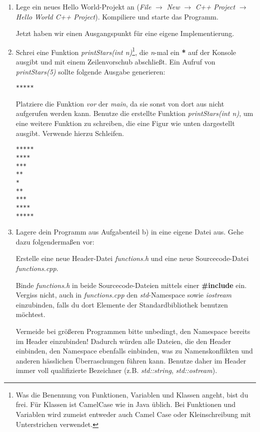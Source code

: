 \documentclass[
  accentcolor=tud1c,	%
  colorbacktitle,		%
  inverttitle,			%
  german,				%
  twoside
]{tudexercise}
\begin{document}
\begin{enumerate}

\item Lege ein neues \glqq{}Hello World\grqq{}-Projekt an (\emph{File} $\rightarrow$ \emph{New} $\rightarrow$ \emph{C++ Project} $\rightarrow$ \emph{Hello World C++ Project}).
Kompiliere und starte das Programm.

Jetzt haben wir einen Ausgangspunkt für eine eigene Implementierung.


\item 
Schrei eine Funktion \emph{printStars(int n)}\footnote{Was die Benennung von Funktionen, Variablen und Klassen angeht, bist du frei.
Für Klassen ist CamelCase wie in Java üblich. Bei Funktionen und Variablen wird zumeist entweder auch Camel Case oder Kleinschreibung mit Unterstrichen verwendet.}, die \emph{n}-mal ein \textbf{*} auf der Konsole ausgibt und mit einem Zeilenvorschub abschließt.
Ein Aufruf von \emph{printStars(5)} sollte folgende Ausgabe generieren:
\begin{lstlisting}
*****
\end{lstlisting}

Platziere die Funktion \emph{vor} der \emph{main}, da sie sonst von dort aus nicht aufgerufen werden kann.
Benutze die erstellte Funktion \emph{printStars(int n)}, um eine weitere Funktion zu schreiben, die eine Figur wie unten dargestellt ausgibt.
Verwende hierzu Schleifen.
\begin{lstlisting}
*****
****
***
**
*
**
***
****
*****
\end{lstlisting}

\item
Lagere dein Programm aus Aufgabenteil b) in eine eigene Datei aus.
Gehe dazu folgendermaßen vor: 

Erstelle eine neue Header-Datei \emph{functions.h} und eine neue Sourcecode-Datei \emph{functions.cpp}. 

Binde \emph{functions.h} in beide Sourcecode-Dateien mittels 
einer \textbf{\#include} ein.
Vergiss nicht, auch in \emph{functions.cpp} den \emph{std}-Namespace sowie \emph{iostream} einzubinden, falls du dort Elemente der Standardbibliothek benutzen möchtest.

Vermeide bei größeren Programmen bitte unbedingt, den Namespace bereits im Header einzubinden!
Dadurch würden alle Dateien, die den Header einbinden, den Namespace ebenfalls einbinden, was zu Namenskonflikten und anderen hässlichen Überraschungen führen kann.
Benutze daher im Header immer voll qualifizierte Bezeichner (z.B. \emph{std::string}, \emph{std::ostream}).


\end{enumerate}
\end{document}
